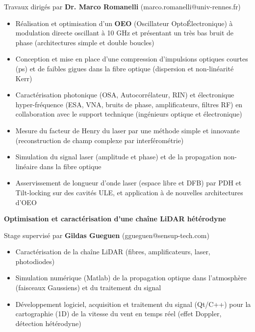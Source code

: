 \documentclass[9pt,a4paper,academicons]{altacv}
\begin{document}
Travaux dirigés par \textbf{Dr. Marco Romanelli} (marco.romanelli@univ-rennes.fr)
\smallskip
\small{
	\begin{itemize}
		\item Réalisation et optimisation d'un \textbf{OEO} (Oscillateur Opto\'Electronique) à modulation directe oscillant à 10 GHz et présentant un très bas bruit de phase (architectures simple et double boucles)
		\item Conception et mise en place d'une compression d'impulsions optiques courtes (ps) et de faibles gigues dans la fibre optique (dispersion et non-linéarité Kerr)
		\item Caractérisation photonique (OSA, Autocorrélateur, RIN) et électronique hyper-fréquence (ESA, VNA, bruits de phase, amplificateurs, filtres RF) en collaboration avec le support technique (ingénieurs optique et électronique)
		\item Mesure du facteur de Henry du laser par une méthode simple et innovante (reconstruction de champ complexe par interférométrie)
		\item Simulation  du signal laser (amplitude et phase) et de la propagation non-linéaire dans la fibre optique
		\item Asservissement de longueur d'onde laser (espace libre et DFB) par PDH et Tilt-locking sur des cavités ULE, et application à de nouvelles architectures d'OEO
	\end{itemize}
}

\divider


\textbf{Optimisation et caractérisation d'une chaîne LiDAR hétérodyne}\smallskip

Stage supervisé par \textbf{Gildas Gueguen} (ggueguen@sensup-tech.com)
\smallskip
\small{
	\begin{itemize}
		\item Caractérisation de la chaîne LiDAR (fibres, amplificateurs, laser, photodiodes)
		\item Simulation numérique (Matlab) de la propagation optique dans l'atmosphère (faisceaux Gaussiens) et du traitement du signal
		\item Développement logiciel, acquisition et traitement du signal (Qt/C++) pour la cartographie (1D) de la vitesse du vent en temps réel (effet Doppler, détection hétérodyne)
	\end{itemize}
}

\divider
\end{document}

